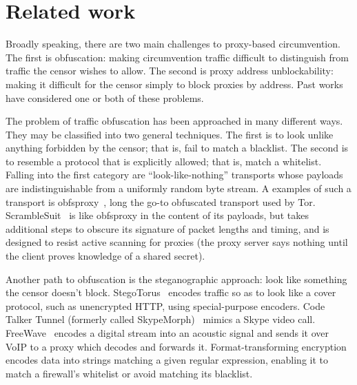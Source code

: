\documentclass{article}
\begin{document}

\section{Related work}


Broadly speaking, there are two main challenges to proxy-based circumvention.
The first is obfuscation: making circumvention traffic difficult to distinguish
from traffic the censor wishes to allow. The second is proxy address
unblockability: making it difficult for the censor simply to block proxies by
address. Past works have considered one or both of these problems.

The problem of traffic obfuscation has been approached in many different ways.
They may be classified into two general techniques.
The first is to look unlike
anything forbidden by the censor; that is, fail to match a blacklist. The second is
to resemble a protocol that is explicitly allowed; that is, match a whitelist.
Falling into the first category are ``look-like-nothing'' transports whose
payloads are indistinguishable from a uniformly random byte stream. A examples
of such a transport is obfsproxy~\cite{obfsproxy}, long the go-to obfuscated
transport used by Tor. ScrambleSuit~\cite{scramblesuit} is like obfsproxy in the
content of its payloads, but takes additional steps to obscure its signature of
packet lengths and timing, and is designed to resist active scanning for proxies
(the proxy server says nothing until the client proves knowledge of a shared
secret).

Another path to obfuscation is the steganographic approach: look like
something the censor doesn't block. StegoTorus~\cite{stegotorus}
encodes traffic so as to look like a cover protocol, such as unencrypted HTTP,
using special-purpose encoders.
Code Talker
Tunnel (formerly called SkypeMorph)~\cite{skypemorph} mimics a Skype video call.
FreeWave~\cite{freewave} encodes a digital stream into an acoustic signal
and sends it over VoIP to a proxy which decodes and forwards it.
Format-transforming encryption~\cite{fte} encodes data into strings matching a given regular expression,
enabling it to match a firewall's whitelist or avoid matching its blacklist.
\end{document}
